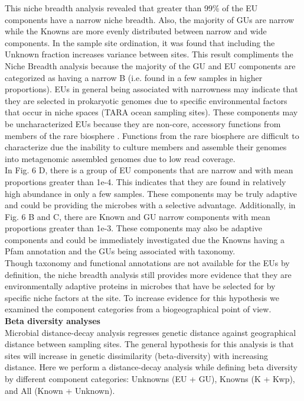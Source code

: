 This niche breadth analysis revealed that greater than 99\% of the EU components have a narrow niche breadth. Also, the majority of GUs are narrow while the Knowns are more evenly distributed between narrow and wide components. In the sample site ordination, it was found that including the Unknown fraction increases variance between sites. This result compliments the Niche Breadth analysis because the majority of the GU and EU components are categorized as having a narrow B (i.e. found in a few samples in higher proportions). EUs in general being associated with narrowness may indicate that they are selected in prokaryotic genomes due to specific environmental factors that occur in niche spaces (TARA ocean sampling sites). These components may be uncharacterized EUs because they are non-core, accessory functions from members of the rare biosphere \citep{McInerney_2017}. Functions from the rare biosphere are difficult to characterize due the inability to culture members and assemble their genomes into metagenomic assembled genomes due to low read coverage. \\

In Fig. 6 D, there is a group of EU components that are narrow and with mean proportions greater than 1e-4. This indicates that they are found in relatively high abundance in only a few samples. These components may be truly adaptive and could be providing the microbes with a selective advantage. Additionally, in Fig. 6 B and C, there are Known and GU narrow components with mean proportions greater than 1e-3. These components may also be adaptive components and could be immediately investigated due the Knowns having a Pfam annotation and the GUs being associated with taxonomy.\\

Though taxonomy and functional annotations are not available for the EUs by definition, the niche breadth analysis still provides more evidence that they are environmentally adaptive proteins in microbes that have be selected for by specific niche factors at the site. To increase evidence for this hypothesis we examined the component categories from a biogeographical point of view. \\

\textbf{Beta diversity analyses}\\

Microbial distance-decay analysis regresses genetic distance against geographical distance between sampling sites. The general hypothesis for this analysis is that sites will increase in genetic dissimilarity (beta-diversity) with increasing distance. Here we perform a distance-decay analysis while defining beta diversity by different component categories: Unknowns (EU + GU), Knowns (K + Kwp), and All (Known + Unknown). \\

